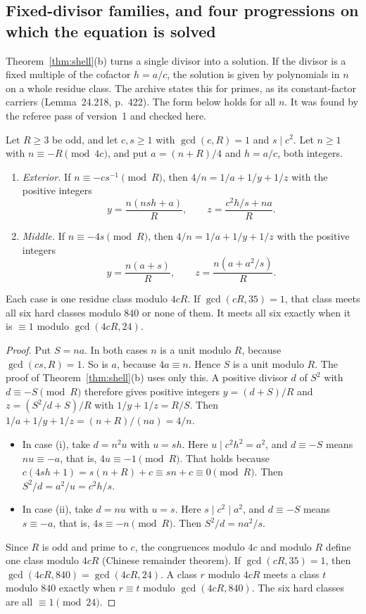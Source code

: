 \subsection{Fixed-divisor families, and four progressions on which the equation is solved}\label{ssec:families}

Theorem~\ref{thm:shell}(b) turns a single divisor into a solution. If the divisor is a fixed multiple of the cofactor $h=a/c$, the solution is given by polynomials in $n$ on a whole residue class. The archive states this for primes, as its constant-factor carriers (Lemma~24.218, p.~422). The form below holds for all $n$. It was found by the referee pass of version~1 and checked here.

\begin{proposition}\label{prop:fixeddivisor}
Let $R\ge3$ be odd, and let $c,s\ge1$ with $\gcd(c,R)=1$ and $s\mid c^2$. Let $n\ge1$ with $n\equiv-R\pmod{4c}$, and put $a=(n+R)/4$ and $h=a/c$, both integers.
\begin{enumerate}[label=(\roman*)]
\item \emph{Exterior.} If $n\equiv-cs^{-1}\pmod R$, then $4/n=1/a+1/y+1/z$ with the positive integers
\[
y=\frac{n(nsh+a)}R,\qquad z=\frac{c^2h/s+na}R .
\]
\item \emph{Middle.} If $n\equiv-4s\pmod R$, then $4/n=1/a+1/y+1/z$ with the positive integers
\[
y=\frac{n(a+s)}R,\qquad z=\frac{n(a+a^2/s)}R .
\]
\end{enumerate}
Each case is one residue class modulo $4cR$. If $\gcd(cR,35)=1$, that class meets all six hard classes modulo $840$ or none of them. It meets all six exactly when it is $\equiv1$ modulo $\gcd(4cR,24)$.
\end{proposition}
\begin{proof}
Put $S=na$. In both cases $n$ is a unit modulo $R$, because $\gcd(cs,R)=1$. So is $a$, because $4a\equiv n$. Hence $S$ is a unit modulo $R$. The proof of Theorem~\ref{thm:shell}(b) uses only this. A positive divisor $d$ of $S^2$ with $d\equiv-S\pmod R$ therefore gives positive integers $y=(d+S)/R$ and $z=(S^2/d+S)/R$ with $1/y+1/z=R/S$. Then $1/a+1/y+1/z=(n+R)/(na)=4/n$.
\begin{itemize}
\item In case (i), take $d=n^2u$ with $u=sh$. Here $u\mid c^2h^2=a^2$, and $d\equiv-S$ means $nu\equiv-a$, that is, $4u\equiv-1\pmod R$. That holds because $c(4sh+1)=s(n+R)+c\equiv sn+c\equiv0\pmod R$. Then $S^2/d=a^2/u=c^2h/s$.
\item In case (ii), take $d=nu$ with $u=s$. Here $s\mid c^2\mid a^2$, and $d\equiv-S$ means $s\equiv-a$, that is, $4s\equiv-n\pmod R$. Then $S^2/d=na^2/s$.
\end{itemize}
Since $R$ is odd and prime to $c$, the congruences modulo $4c$ and modulo $R$ define one class modulo $4cR$ (Chinese remainder theorem). If $\gcd(cR,35)=1$, then $\gcd(4cR,840)=\gcd(4cR,24)$. A class $r$ modulo $4cR$ meets a class $t$ modulo $840$ exactly when $r\equiv t$ modulo $\gcd(4cR,840)$. The six hard classes are all $\equiv1\pmod{24}$.
\end{proof}

